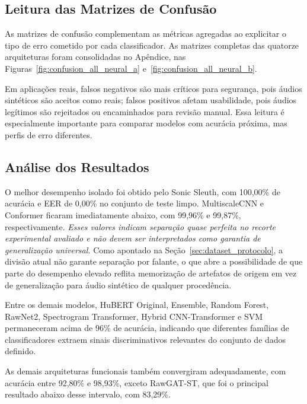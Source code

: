 \documentclass[12pt,a4paper]{article}
\begin{document}
\subsection{Leitura das Matrizes de Confusão}

As matrizes de confusão complementam as métricas agregadas ao explicitar o
tipo de erro cometido por cada classificador. As matrizes completas das
quatorze arquiteturas foram consolidadas no Apêndice, nas
Figuras~\ref{fig:confusion_all_neural_a} e~\ref{fig:confusion_all_neural_b}.

Em aplicações reais, falsos negativos são mais críticos para segurança, pois
áudios sintéticos são aceitos como reais; falsos positivos afetam usabilidade,
pois áudios legítimos são rejeitados ou encaminhados para revisão manual. Essa
leitura é especialmente importante para comparar modelos com acurácia próxima,
mas perfis de erro diferentes.

\subsection{Análise dos Resultados}

O melhor desempenho isolado foi obtido pelo Sonic Sleuth, com 100,00\% de
acurácia e EER de 0,00\% no conjunto de teste limpo. MultiscaleCNN e Conformer
ficaram imediatamente abaixo, com 99,96\% e 99,87\%, respectivamente.
\emph{Esses valores indicam separação quase perfeita no recorte experimental
avaliado e não devem ser interpretados como garantia de generalização
universal.} Como apontado na Seção~\ref{sec:dataset_protocolo}, a divisão
atual não garante separação por falante, o que abre a possibilidade de
que parte do desempenho elevado reflita memorização de artefatos de origem
em vez de generalização para áudio sintético de qualquer procedência.

Entre os demais modelos, HuBERT Original, Ensemble, Random Forest, RawNet2,
Spectrogram Transformer, Hybrid CNN-Transformer e SVM permaneceram acima de
96\% de acurácia, indicando que diferentes famílias de classificadores extraem
sinais discriminativos relevantes do conjunto de dados definido.

As demais arquiteturas funcionais também convergiram adequadamente, com
acurácia entre 92,80\% e 98,93\%, exceto RawGAT-ST, que foi o principal
resultado abaixo desse intervalo, com 83,29\%.
\end{document}
